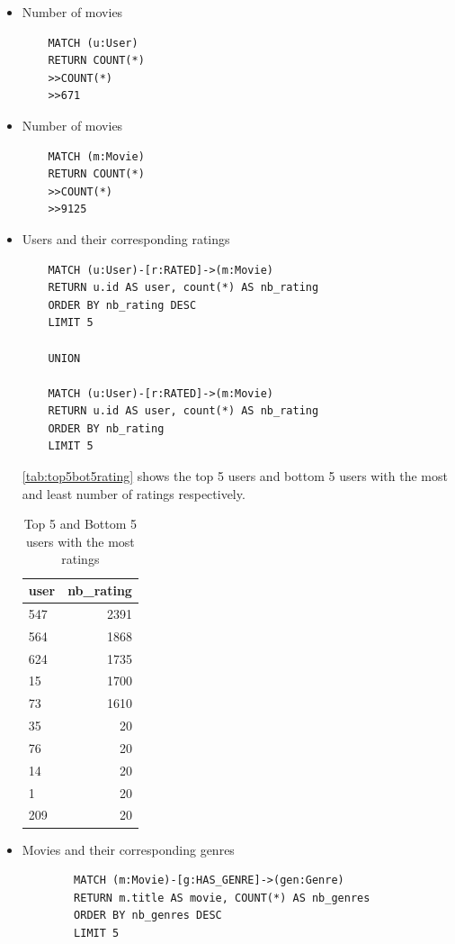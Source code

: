 \documentclass{article}
\begin{document}
\begin{itemize}
    \item Number of movies
    \begin{verbatim}
    MATCH (u:User)
    RETURN COUNT(*)
    >>COUNT(*)
    >>671
    \end{verbatim}

    \item Number of movies
    \begin{verbatim}
    MATCH (m:Movie)
    RETURN COUNT(*)
    >>COUNT(*)
    >>9125
    \end{verbatim}

    \item Users and their corresponding ratings
    \begin{verbatim}
    MATCH (u:User)-[r:RATED]->(m:Movie)
    RETURN u.id AS user, count(*) AS nb_rating
    ORDER BY nb_rating DESC
    LIMIT 5
    
    UNION 
    
    MATCH (u:User)-[r:RATED]->(m:Movie)
    RETURN u.id AS user, count(*) AS nb_rating
    ORDER BY nb_rating
    LIMIT 5
    \end{verbatim}

    \autoref{tab:top5bot5rating} shows the top 5 users and bottom 5 users with the most and least number of ratings respectively. 
         
    \begin{table}[!ht]
    \centering
    \caption{Top 5 and Bottom 5 users with the most ratings}
    \label{tab:top5bot5rating}
    \begin{tabular}{lr}
    \hline
        user & nb\_rating \\ \hline
        547 & 2391 \\ 
        564 & 1868 \\ 
        624 & 1735 \\ 
        15 & 1700 \\ 
        73 & 1610 \\ 
        35 & 20 \\ 
        76 & 20 \\ 
        14 & 20 \\ 
        1 & 20 \\ 
        209 & 20 \\ \hline
    \end{tabular}
    \end{table}

    \item Movies and their corresponding genres
    \begin{verbatim}
        MATCH (m:Movie)-[g:HAS_GENRE]->(gen:Genre)
        RETURN m.title AS movie, COUNT(*) AS nb_genres
        ORDER BY nb_genres DESC
        LIMIT 5
    \end{verbatim}


\end{itemize}
\end{document}
